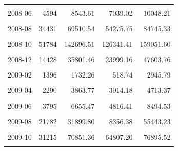 \begin{longtable}[t]{crrrr}
\cellcolor{gray!10}{2008-05} & \cellcolor{gray!10}{2951} & \cellcolor{gray!10}{5451.85} & \cellcolor{gray!10}{4725.13} & \cellcolor{gray!10}{6178.57}\\
2008-06 & 4594 & 8543.61 & 7039.02 & 10048.21\\
\cellcolor{gray!10}{2008-07} & \cellcolor{gray!10}{14029} & \cellcolor{gray!10}{21853.93} & \cellcolor{gray!10}{19471.39} & \cellcolor{gray!10}{24236.46}\\
2008-08 & 34431 & 69510.54 & 54275.75 & 84745.33\\
\cellcolor{gray!10}{2008-09} & \cellcolor{gray!10}{50671} & \cellcolor{gray!10}{121161.09} & \cellcolor{gray!10}{111900.50} & \cellcolor{gray!10}{130421.67}\\
2008-10 & 51784 & 142696.51 & 126341.41 & 159051.60\\
\cellcolor{gray!10}{2008-11} & \cellcolor{gray!10}{30724} & \cellcolor{gray!10}{79108.08} & \cellcolor{gray!10}{63004.43} & \cellcolor{gray!10}{95211.72}\\
2008-12 & 14428 & 35801.46 & 23999.16 & 47603.76\\
\cellcolor{gray!10}{2009-01} & \cellcolor{gray!10}{3874} & \cellcolor{gray!10}{7772.22} & \cellcolor{gray!10}{5936.42} & \cellcolor{gray!10}{9608.01}\\
2009-02 & 1396 & 1732.26 & 518.74 & 2945.79\\
\cellcolor{gray!10}{2009-03} & \cellcolor{gray!10}{2002} & \cellcolor{gray!10}{2500.53} & \cellcolor{gray!10}{869.08} & \cellcolor{gray!10}{4131.99}\\
2009-04 & 2290 & 3863.77 & 3014.18 & 4713.37\\
\cellcolor{gray!10}{2009-05} & \cellcolor{gray!10}{3138} & \cellcolor{gray!10}{5813.32} & \cellcolor{gray!10}{5131.98} & \cellcolor{gray!10}{6494.66}\\
2009-06 & 3795 & 6655.47 & 4816.41 & 8494.53\\
\cellcolor{gray!10}{2009-07} & \cellcolor{gray!10}{7824} & \cellcolor{gray!10}{17644.39} & \cellcolor{gray!10}{13081.03} & \cellcolor{gray!10}{22207.76}\\
2009-08 & 21782 & 31899.80 & 8356.38 & 55443.23\\
\cellcolor{gray!10}{2009-09} & \cellcolor{gray!10}{36116} & \cellcolor{gray!10}{64247.22} & \cellcolor{gray!10}{50226.82} & \cellcolor{gray!10}{78267.63}\\
2009-10 & 31215 & 70851.36 & 64807.20 & 76895.52\\
\cellcolor{gray!10}{2009-11} & \cellcolor{gray!10}{29396} & \cellcolor{gray!10}{74012.87} & \cellcolor{gray!10}{59420.44} & \cellcolor{gray!10}{88605.29}\\

\end{longtable}
